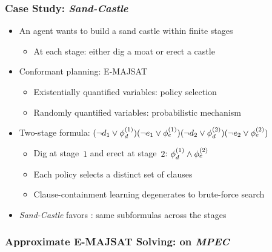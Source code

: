 \begin{frame}
    \frametitle{Case Study: \textit{Sand-Castle}}
    \begin{itemize}
        \item An agent wants to build a sand castle within finite stages
              \begin{itemize}
                  \item At each stage: either dig a moat or erect a castle
              \end{itemize}
              \pause
        \item Conformant planning: E-MAJSAT
              \begin{itemize}
                  \item Existentially quantified variables: policy selection
                  \item Randomly quantified variables: probabilistic mechanism
              \end{itemize}
              \pause
        \item Two-stage formula: $(\lnot d_1\lor \phi_d^{(1)})(\lnot e_1\lor \phi_e^{(1)})(\lnot d_2\lor \phi_d^{(2)})(\lnot e_2\lor \phi_e^{(2)})$
              \begin{itemize}
                  \item Dig at stage~$1$ and erect at stage~$2$: $\phi_d^{(1)}\land\phi_e^{(2)}$
                  \item Each policy selects a distinct set of clauses
                  \item Clause-containment learning degenerates to brute-force search
              \end{itemize}
              \pause
        \item \textit{Sand-Castle} favors \dcssat: same subformulas  across the stages
    \end{itemize}
\end{frame}

\begin{frame}
    \frametitle{Approximate E-MAJSAT Solving: \erssat on \textit{MPEC}}
    \begin{table}[ht]
        \centering
        \scriptsize
    \end{table}
\end{frame}

